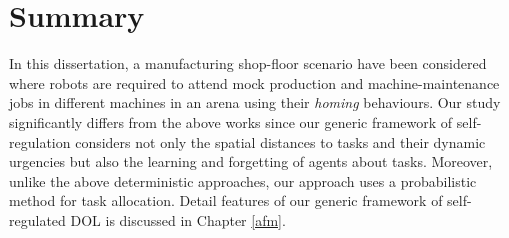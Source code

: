 \section{Summary} 

In this dissertation,  a manufacturing shop-floor scenario have been considered where robots are required to attend mock production and machine-maintenance jobs in different machines in an arena using their {\em homing} behaviours. Our study significantly differs from the above works since our generic framework of self-regulation considers not only the spatial distances to tasks and their dynamic urgencies but also the learning and forgetting of agents about tasks. Moreover, unlike the above deterministic approaches, our approach uses a probabilistic method for task allocation. Detail features of our generic framework of self-regulated DOL is discussed in Chapter \ref{afm}.